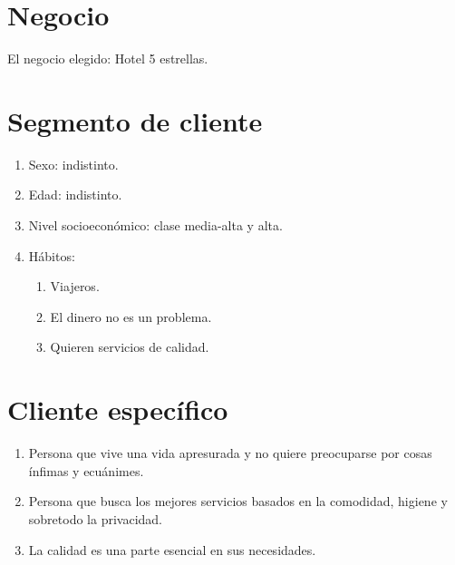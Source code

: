 





\section{Negocio}

El negocio elegido: Hotel 5 estrellas. 

\section{Segmento de cliente }

\begin{enumerate}
	\item Sexo: indistinto.
	\item Edad: indistinto. 
	\item Nivel socioeconómico: clase media-alta y alta. 
	\item Hábitos: \begin{enumerate}
		\item Viajeros.
		\item El dinero no es un problema.
		\item Quieren servicios de calidad. 
	\end{enumerate}
\end{enumerate}

\section{Cliente específico}

\begin{enumerate}
	\item Persona que vive una vida apresurada y no quiere preocuparse por cosas ínfimas y ecuánimes. 
	\item Persona que busca los mejores servicios basados en la comodidad, higiene y sobretodo la privacidad. 
	\item La calidad es una parte esencial en sus necesidades. 
\end{enumerate}






%
%

